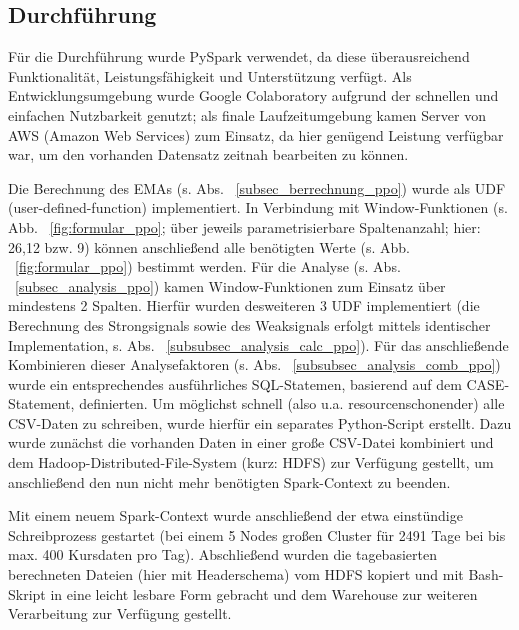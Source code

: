 \subsection{Durchführung}
Für die Durchführung wurde PySpark verwendet, da diese überausreichend Funktionalität, Leistungsfähigkeit und Unterstützung verfügt. Als Entwicklungsumgebung wurde Google Colaboratory aufgrund der schnellen und einfachen Nutzbarkeit genutzt; als finale Laufzeitumgebung kamen Server von AWS (Amazon Web Services) zum Einsatz, da hier genügend Leistung verfügbar war, um den vorhanden Datensatz zeitnah bearbeiten zu können.

Die Berechnung des EMAs (s. Abs. ~\ref{subsec_berrechnung_ppo}) wurde als UDF (user-defined-function) implementiert. In Verbindung mit Window-Funk\-tionen (s. Abb. ~\ref{fig:formular_ppo}; über jeweils parametrisierbare Spaltenanzahl; hier: 26,12 bzw. 9) können anschließend alle benötigten Werte (s. Abb. ~\ref{fig:formular_ppo}) bestimmt werden.
Für die Analyse (s. Abs. ~\ref{subsec_analysis_ppo}) kamen Window-Funktionen zum Einsatz über mindestens 2 Spalten. Hierfür wurden desweiteren 3 UDF implementiert (die Berechnung des Strongsignals sowie des Weaksignals erfolgt mittels identischer Implementation, s. Abs. ~\ref{subsubsec_analysis_calc_ppo}). Für das anschließende Kombinieren dieser Analysefaktoren (s. Abs. ~\ref{subsubsec_analysis_comb_ppo}) wurde ein entsprechendes ausführliches SQL-Statemen, basierend auf dem CASE-Statement, definierten.
Um möglichst schnell (also u.a. resourcenschonender) alle CSV-Daten zu schreiben, wurde hierfür ein separates Python-Script erstellt. Dazu wurde zunächst die vorhanden Daten in einer große CSV-Datei kombiniert und dem Hadoop-Distributed-File-System (kurz: HDFS) zur Verfügung gestellt, um anschließend den nun nicht mehr benötigten Spark-Context zu beenden. 

Mit einem neuem Spark-Context wurde anschließend der etwa einstündige Schreibprozess gestartet (bei einem 5 Nodes großen Cluster für 2491 Tage bei bis max. 400 Kursdaten pro Tag). Abschließend wurden die tagebasierten berechneten Dateien (hier mit Headerschema) vom HDFS kopiert und mit Bash-Skript in eine leicht lesbare Form gebracht und dem Warehouse zur weiteren Verarbeitung zur Verfügung gestellt. 


